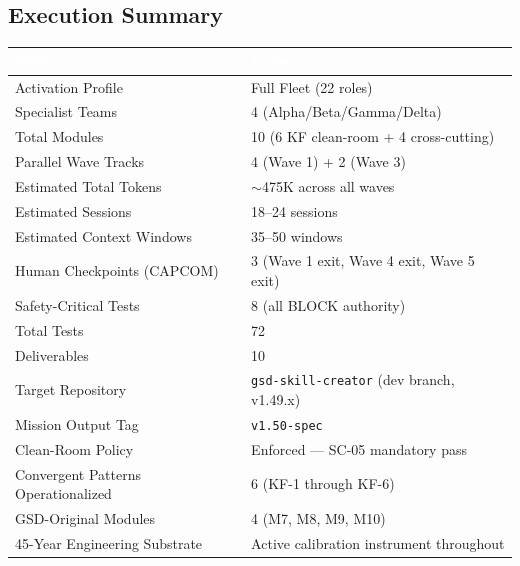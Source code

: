 \documentclass[11pt,letterpaper]{article}
\newcommand{\tableheader}[1]{\textbf{\sffamily\textcolor{white}{#1}}}
\begin{document}
\subsection{Execution Summary}

\begin{center}
\begin{tabularx}{\textwidth}{L{5cm}X}
\toprule
{}
\tableheader{Metric} & \tableheader{Value} \\
\midrule
Activation Profile & Full Fleet (22 roles) \\
Specialist Teams & 4 (Alpha/Beta/Gamma/Delta) \\
Total Modules & 10 (6 KF clean-room + 4 cross-cutting) \\
Parallel Wave Tracks & 4 (Wave 1) + 2 (Wave 3) \\
Estimated Total Tokens & $\sim$475K across all waves \\
Estimated Sessions & 18--24 sessions \\
Estimated Context Windows & 35--50 windows \\
Human Checkpoints (CAPCOM) & 3 (Wave 1 exit, Wave 4 exit, Wave 5 exit) \\
Safety-Critical Tests & 8 (all BLOCK authority) \\
Total Tests & 72 \\
Deliverables & 10 \\
Target Repository & \texttt{gsd-skill-creator} (dev branch, v1.49.x) \\
Mission Output Tag & \texttt{v1.50-spec} \\
Clean-Room Policy & Enforced --- SC-05 mandatory pass \\
Convergent Patterns Operationalized & 6 (KF-1 through KF-6) \\
GSD-Original Modules & 4 (M7, M8, M9, M10) \\
45-Year Engineering Substrate & Active calibration instrument throughout \\
\end{tabularx}
\end{center}

\vspace{2em}
\end{document}
